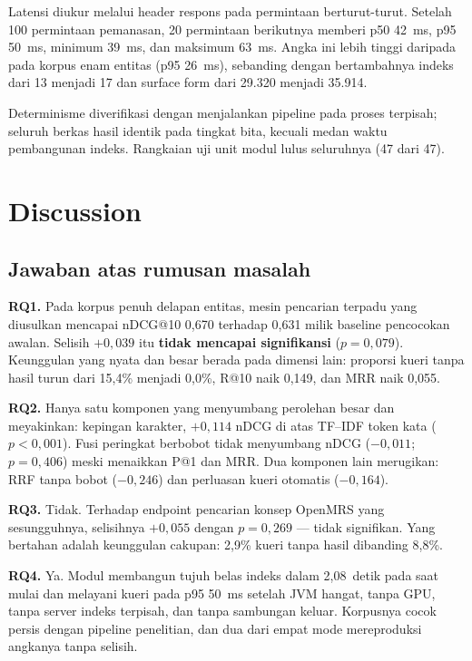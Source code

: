 \documentclass[journal,twoside,web]{ieeecolor}
\begin{document}
Latensi diukur melalui header respons pada permintaan berturut-turut. Setelah
100 permintaan pemanasan, 20 permintaan berikutnya memberi p50 42~ms, p95 50~ms,
minimum 39~ms, dan maksimum 63~ms. Angka ini lebih tinggi daripada pada korpus
enam entitas (p95 26~ms), sebanding dengan bertambahnya indeks dari 13 menjadi
17 dan surface form dari 29.320 menjadi 35.914.

Determinisme diverifikasi dengan menjalankan pipeline pada proses terpisah;
seluruh berkas hasil identik pada tingkat bita, kecuali medan waktu pembangunan
indeks. Rangkaian uji unit modul lulus seluruhnya (47 dari 47).

\section{Discussion}
\label{sec:diskusi}

\subsection{Jawaban atas rumusan masalah}

\textbf{RQ1.} Pada korpus penuh delapan entitas, mesin pencarian terpadu yang
diusulkan mencapai nDCG@10 0,670 terhadap 0,631 milik baseline pencocokan awalan.
Selisih $+0{,}039$ itu \textbf{tidak mencapai signifikansi} ($p = 0{,}079$).
Keunggulan yang nyata dan besar berada pada dimensi lain: proporsi kueri tanpa
hasil turun dari 15,4\% menjadi 0,0\%, R@10 naik 0,149, dan MRR naik 0,055.

\textbf{RQ2.} Hanya satu komponen yang menyumbang perolehan besar dan meyakinkan:
kepingan karakter, $+0{,}114$ nDCG di atas TF--IDF token kata ($p < 0{,}001$).
Fusi peringkat berbobot tidak menyumbang nDCG ($-0{,}011$; $p = 0{,}406$) meski
menaikkan P@1 dan MRR. Dua komponen lain merugikan: RRF tanpa bobot
($-0{,}246$) dan perluasan kueri otomatis ($-0{,}164$).

\textbf{RQ3.} Tidak. Terhadap endpoint pencarian konsep OpenMRS yang
sesungguhnya, selisihnya $+0{,}055$ dengan $p = 0{,}269$ --- tidak signifikan.
Yang bertahan adalah keunggulan cakupan: 2,9\% kueri tanpa hasil dibanding 8,8\%.

\textbf{RQ4.} Ya. Modul membangun tujuh belas indeks dalam 2,08~detik pada saat
mulai dan melayani kueri pada p95 50~ms setelah JVM hangat, tanpa GPU, tanpa
server indeks terpisah, dan tanpa sambungan keluar. Korpusnya cocok persis dengan
pipeline penelitian, dan dua dari empat mode mereproduksi angkanya tanpa selisih.
\end{document}
